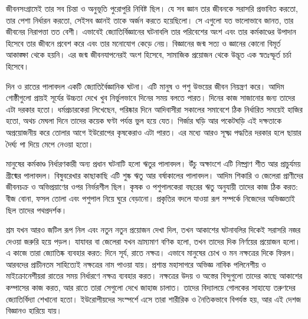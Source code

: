 
 জীবনসংগ্রামেই তার সব চিন্তা ও অনুভূতি পুরোপুরি নিবিষ্ট ছিল। যে সব জ্ঞান তার জীবনকে সরাসরি প্রভাবিত করতো, তার পেশা নির্ধারন করতো, সেইসব জ্ঞানই তাকে অর্জন করতে হয়েছিলো। সে এগুলো যত ভালোভাবে জানত, তার জীবনের নিরাপত্তা তত বেশী। এভাবেই জ্যোতির্বিজ্ঞানের ঘটনাবলি তার পরিবেশের অংশ এবং তার কর্মকাণ্ডের উপাদান হিসেবে তার জীবনে প্রবেশ করে এবং তার মনোযোগ কেড়ে নেয়। বিজ্ঞানের জন্ম সত্য ও জ্ঞানের কোনো বিমূর্ত আকাঙ্ক্ষা থেকে হয়নি। এর জন্ম জীবনযাপনেরই অংশ হিসেবে, সামাজিক প্রয়োজন থেকে উদ্ভূত এক স্বতঃস্ফূর্ত চর্চা হিসেবে।

দিন ও রাতের পালাবদল একটি জ্যোতির্বৈজ্ঞানিক ঘটনা। এটি মানুষ ও পশু উভয়ের জীবন নিয়ন্ত্রণ করে। আদিম গোষ্ঠীগুলো প্রায়ই সূর্যের উচ্চতা দেখে খুব নির্ভুলভাবে দিনের সময় বলতে পারত। দিনের কাজ সাজানোর জন্য তাদের এটা দরকার হতো। ধর্মপ্রচারকেরা লিখেছেন, পরিষ্কার দিনে আদিবাসীরা সকালের সমাবেশে ঠিক নির্ধারিত সময়েই হাজির হতো, অথচ মেঘলা দিনে তাদের কয়েক ঘণ্টা পর্যন্ত ভুল হয়ে যেত। গির্জার ঘড়ি আর পকেটঘড়ি এই দক্ষতাকে অপ্রয়োজনীয় করে তোলার আগে ইউরোপের কৃষকেরাও এটা পারত। এর মধ্যে আরও সূক্ষ্ম পদ্ধতির দরকার হলে ছায়ার দৈর্ঘ্য পা দিয়ে মেপে নেওয়া হতো।

মানুষের কর্মকাণ্ড নির্ধারণকারী অন্য প্রধান ঘটনাটি হলো ঋতুর পালাবদল। উঁচু অক্ষাংশে এটি নিষ্প্রাণ শীত আর প্রাচুর্যময় গ্রীষ্মের পালাবদল। বিষুবরেখার কাছাকাছি এটি শুষ্ক ঋতু আর বর্ষাকালের পালাবদল। আদিম শিকারি ও জেলেরা প্রাণীদের জীবনচক্র ও অভিপ্রয়াণের ওপর নির্ভরশীল ছিল। কৃষক ও পশুপালকেরা বছরের ঋতু অনুযায়ী তাদের কাজ ঠিক করত: বীজ বোনা, ফসল তোলা এবং পশুপাল নিয়ে ঘুরে বেড়ানো। প্রকৃতির বদলে যাওয়া রূপ সম্পর্কে নিজেদের অভিজ্ঞতাই ছিল তাদের পথপ্রদর্শক।

শ্রম যখন আরও জটিল রূপ নিল এবং নতুন নতুন প্রয়োজন দেখা দিল, তখন আকাশের ঘটনাবলির দিকেই সরাসরি নজর দেওয়া জরুরি হয়ে পড়ল। যাযাবর বা জেলেরা যখন ভ্রাম্যমাণ বণিক হলো, তখন তাদের দিক নির্ণয়ের প্রয়োজন হলো। এ কাজে তারা জ্যোতিষ্ক ব্যবহার করত: দিনে সূর্য, রাতে নক্ষত্র। এভাবে মানুষের চোখ ও মন নক্ষত্রের দিকে ফিরল। আরবদের প্রাচীনতম সাহিত্যেই নক্ষত্রের নাম পাওয়া যায়। প্রশান্ত মহাসাগরে অভিজ্ঞ নাবিক পলিনেশীয় ও মাইক্রোনেশীয়রা রাতের সময় নির্ধারণে নক্ষত্র ব্যবহার করত। নক্ষত্রের উদয় ও অস্তের বিন্দুগুলো তাদের কাছে আকাশের কম্পাসের কাজ করত, আর রাতে তারা সেগুলো দেখে জাহাজ চালাত। তাদের বিদ্যালয়ে গোলকের সাহায্যে তরুণদের জ্যোতির্বিদ্যা শেখানো হতো। ইউরোপীয়দের সংস্পর্শে এসে তারা শারীরিক ও নৈতিকভাবে বিপর্যস্ত হয়, আর এই দেশজ বিজ্ঞানও হারিয়ে যায়।

